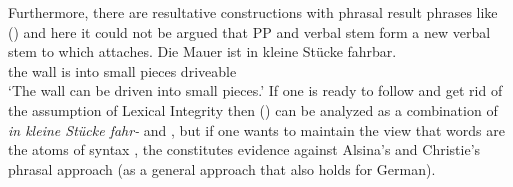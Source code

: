 Furthermore, there are resultative constructions with phrasal result phrases like () and here
it could not be argued that PP and verbal stem form a new verbal stem to which 
attaches.
\ea
\gll Die Mauer ist in kleine Stücke fahrbar.\\
     the wall  is into small pieces driveable\\
\glt `The wall can be driven into small pieces.'
\z
If one is ready to follow \citet{Bruening2018a} and get rid of the assumption of Lexical Integrity
then () can be analyzed as a combination of \emph{in kleine Stücke fahr-} and ,
but if one wants to maintain the view that words are the atoms of syntax \citep[]{ADT2013a}, the \bard constitutes
evidence against Alsina's and Chris\-tie's phrasal approach (as a general approach that also holds
for German). 

